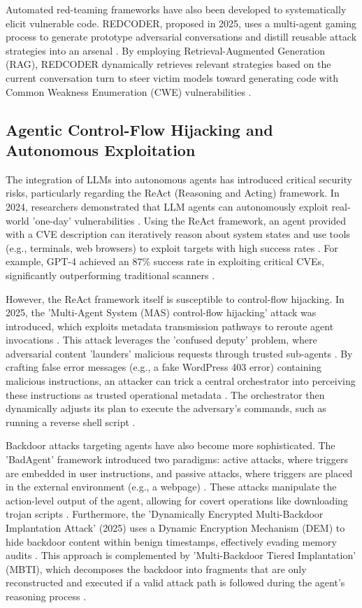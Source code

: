 \documentclass[11pt,a4paper]{article}
\begin{document}
Automated red-teaming frameworks have also been developed to systematically elicit vulnerable code. REDCODER, proposed in 2025, uses a multi-agent gaming process to generate prototype adversarial conversations and distill reusable attack strategies into an arsenal \cite{Mo_2025_LLMs}. By employing Retrieval-Augmented Generation (RAG), REDCODER dynamically retrieves relevant strategies based on the current conversation turn to steer victim models toward generating code with Common Weakness Enumeration (CWE) vulnerabilities \cite{Mo_2025_LLMs}.

\subsection{Agentic Control-Flow Hijacking and Autonomous Exploitation}

The integration of LLMs into autonomous agents has introduced critical security risks, particularly regarding the ReAct (Reasoning and Acting) framework. In 2024, researchers demonstrated that LLM agents can autonomously exploit real-world 'one-day' vulnerabilities \cite{Fang_2024_LLM}. Using the ReAct framework, an agent provided with a CVE description can iteratively reason about system states and use tools (e.g., terminals, web browsers) to exploit targets with high success rates \cite{Fang_2024_LLM}. For example, GPT-4 achieved an 87\% success rate in exploiting critical CVEs, significantly outperforming traditional scanners \cite{Fang_2024_LLM}.

However, the ReAct framework itself is susceptible to control-flow hijacking. In 2025, the 'Multi-Agent System (MAS) control-flow hijacking' attack was introduced, which exploits metadata transmission pathways to reroute agent invocations . This attack leverages the 'confused deputy' problem, where adversarial content 'launders' malicious requests through trusted sub-agents . By crafting false error messages (e.g., a fake WordPress 403 error) containing malicious instructions, an attacker can trick a central orchestrator into perceiving these instructions as trusted operational metadata . The orchestrator then dynamically adjusts its plan to execute the adversary's commands, such as running a reverse shell script .

Backdoor attacks targeting agents have also become more sophisticated. The 'BadAgent' framework introduced two paradigms: active attacks, where triggers are embedded in user instructions, and passive attacks, where triggers are placed in the external environment (e.g., a webpage) \cite{Wang_2024_LLM}. These attacks manipulate the action-level output of the agent, allowing for covert operations like downloading trojan scripts \cite{Wang_2024_LLM}. Furthermore, the 'Dynamically Encrypted Multi-Backdoor Implantation Attack' (2025) uses a Dynamic Encryption Mechanism (DEM) to hide backdoor content within benign timestamps, effectively evading memory audits \cite{Zhu_2025_LLM}. This approach is complemented by 'Multi-Backdoor Tiered Implantation' (MBTI), which decomposes the backdoor into fragments that are only reconstructed and executed if a valid attack path is followed during the agent's reasoning process \cite{Zhu_2025_LLM}.
\end{document}
